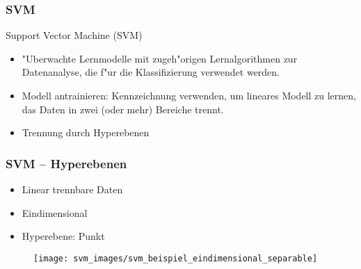 \begin{frame}

\frametitle{SVM}

Support Vector Machine (SVM)

\begin{itemize}
	\setlength{\itemsep}{15pt}
	\item "Uberwachte Lernmodelle mit zugeh"origen Lernalgorithmen zur Datenanalyse, die f"ur die Klassifizierung verwendet werden.
	\item \glqq Modell antrainieren\grqq : Kennzeichnung verwenden, um lineares Modell zu lernen, das Daten in zwei (oder mehr) Bereiche trennt.
	\item Trennung durch Hyperebenen
\end{itemize}

\end{frame}









\begin{frame}

\frametitle{SVM -- Hyperebenen}

\begin{itemize}
	\setlength{\itemsep}{5pt}
	\item Linear trennbare Daten
	\item Eindimensional
	\item Hyperebene: Punkt
\end{itemize}

\vspace{15pt}

\begin{figure}[h]
\centering
\texttt{[image: svm\_images/svm\_beispiel\_eindimensional\_separable]}
\end{figure}

\end{frame}







